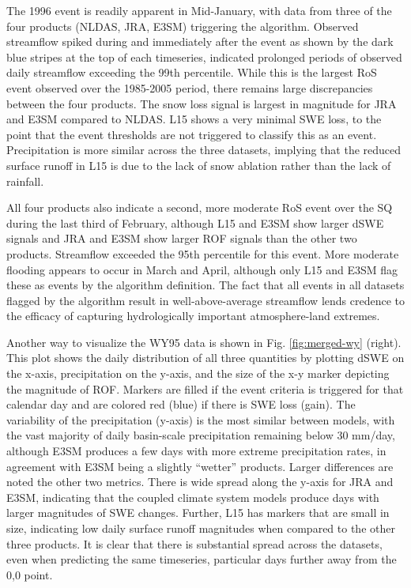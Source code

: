 \documentclass[draft]{agujournal2019}
\begin{document}
The 1996 event is readily apparent in Mid-January, with data from three of the four products (NLDAS, JRA, E3SM) triggering the algorithm. Observed streamflow spiked during and immediately after the event as shown by the dark blue stripes at the top of each timeseries, indicated prolonged periods of observed daily streamflow exceeding the 99th percentile. While this is the largest RoS event observed over the 1985-2005 period, there remains large discrepancies between the four products. The snow loss signal is largest in magnitude for JRA and E3SM compared to NLDAS. L15 shows a very minimal SWE loss, to the point that the event thresholds are not triggered to classify this as an event. Precipitation is more similar across the three datasets, implying that the reduced surface runoff in L15 is due to the lack of snow ablation rather than the lack of rainfall.

All four products also indicate a second, more moderate RoS event over the SQ during the last third of February, although L15 and E3SM show larger dSWE signals and JRA and E3SM show larger ROF signals than the other two products. Streamflow exceeded the 95th percentile for this event. More moderate flooding appears to occur in March and April, although only L15 and E3SM flag these as events by the algorithm definition. The fact that all events in all datasets flagged by the algorithm result in well-above-average streamflow lends credence to the efficacy of capturing hydrologically important atmosphere-land extremes.

Another way to visualize the WY95 data is shown in Fig. \ref{fig:merged-wy} (right).  This plot shows the daily distribution of all three quantities by plotting dSWE on the x-axis, precipitation on the y-axis, and the size of the x-y marker depicting the magnitude of ROF. Markers are filled if the event criteria is triggered for that calendar day and are colored red (blue) if there is SWE loss (gain). The variability of the precipitation (y-axis) is the most similar between models, with the vast majority of daily basin-scale precipitation remaining below 30 mm/day, although E3SM produces a few days with more extreme precipitation rates, in agreement with E3SM being a slightly ``wetter'' products. Larger differences are noted the other two metrics. There is wide spread along the y-axis for JRA and E3SM, indicating that the coupled climate system models produce days with larger magnitudes of SWE changes. Further, L15 has markers that are small in size, indicating low daily surface runoff magnitudes when compared to the other three products. It is clear that there is substantial spread across the datasets, even when predicting the same timeseries, particular days further away from the 0,0 point.
\end{document}
